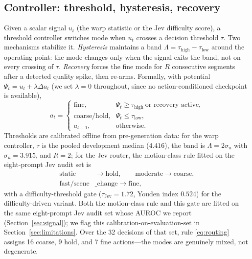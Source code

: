 \documentclass[journal]{IEEEtran}
\begin{document}
\subsection{Controller: threshold, hysteresis, recovery}
\label{sec:controller}
Given a scalar signal $u_t$ (the warp statistic or the Jev difficulty score), a threshold controller switches mode when $u_t$ crosses a decision threshold $\tau$. Two mechanisms stabilize it. \emph{Hysteresis} maintains a band $\Lambda = \tau_{\text{high}} - \tau_{\text{low}}$ around the operating point: the mode changes only when the signal exits the band, not on every crossing of $\tau$. \emph{Recovery} forces the fine mode for $R$ consecutive segments after a detected quality spike, then re-arms. Formally, with potential $\Psi_t = u_t + \lambda \Delta a_t$ (we set $\lambda{=}0$ throughout, since no action-conditioned checkpoint is available),
\begin{equation}
a_t =
\begin{cases}
\text{fine}, & \Psi_t \ge \tau_{\text{high}} \ \text{or recovery active},\\
\text{coarse/hold}, & \Psi_t \le \tau_{\text{low}},\\
a_{t-1}, & \text{otherwise}.
\end{cases}
\label{eq:policy}
\end{equation}
Thresholds are calibrated offline from pre-generation data: for the warp controller, $\tau$ is the pooled development median ($4.416$), the band is $\Lambda = 2\sigma_u$ with $\sigma_u = 3.915$, and $R{=}2$; for the Jev router, the motion-class rule fitted on the eight-prompt Jev audit set is
\begin{equation}
\begin{aligned}
\text{static} &\rightarrow \text{hold},\qquad
\text{moderate} \rightarrow \text{coarse},\\
\text{fast}/\text{scene}&\text{\_change} \rightarrow \text{fine},
\end{aligned}
\label{eq:routing}
\end{equation}
with a difficulty-threshold gate ($\tau_{\text{Jev}} = 1.72$, Youden index $0.524$) for the difficulty-driven variant. Both the motion-class rule and this gate are fitted on the same eight-prompt Jev audit set whose AUROC we report (Section~\ref{sec:signal}); we flag this calibration-on-evaluation-set in Section~\ref{sec:limitations}. Over the 32 decisions of that set, rule \eqref{eq:routing} assigns 16 coarse, 9 hold, and 7 fine actions---the modes are genuinely mixed, not degenerate.
\end{document}
